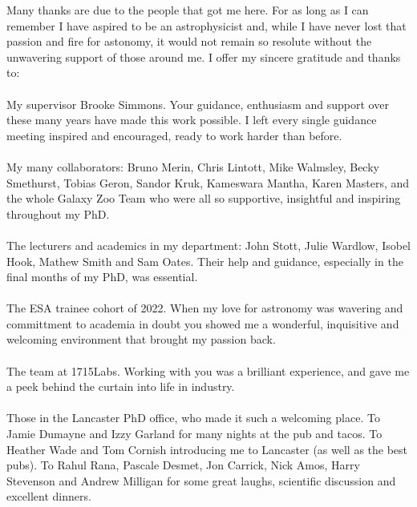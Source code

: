 

\begin{acknowledgements}      %
Many thanks are due to the people that got me here. For as long as I can remember I have aspired to be an astrophysicist and, while I have never lost that passion and fire for astonomy, it would not remain so resolute without the unwavering support of those around me. I offer my sincere gratitude and thanks to:
\\
\\
My supervisor Brooke Simmons. Your guidance, enthusiasm and support over these many years have made this work possible. I left every single guidance meeting inspired and encouraged, ready to work harder than before.
\\
\\
My many collaborators: Bruno Merin, Chris Lintott, Mike Walmsley, Becky Smethurst, Tobias Geron, Sandor Kruk, Kameswara Mantha, Karen Masters, and the whole Galaxy Zoo Team who were all so supportive, insightful and inspiring throughout my PhD. 
\\
\\
The lecturers and academics in my department: John Stott, Julie Wardlow, Isobel Hook, Mathew Smith and Sam Oates. Their help and guidance, especially in the final months of my PhD, was essential.
\\
\\
The ESA trainee cohort of 2022. When my love for astronomy was wavering and committment to academia in doubt you showed me a wonderful, inquisitive and welcoming environment that brought my passion back.
\\
\\
The team at 1715Labs. Working with you was a brilliant experience, and gave me a peek behind the curtain into life in industry.
\\
\\
Those in the Lancaster PhD office, who made it such a welcoming place. To Jamie Dumayne and Izzy Garland for many nights at the pub and tacos. To Heather Wade and Tom Cornish introducing me to Lancaster (as well as the best pubs). To Rahul Rana, Pascale Desmet, Jon Carrick, Nick Amos, Harry Stevenson and Andrew Milligan for some great laughs, scientific discussion and excellent dinners.

\end{acknowledgements}
